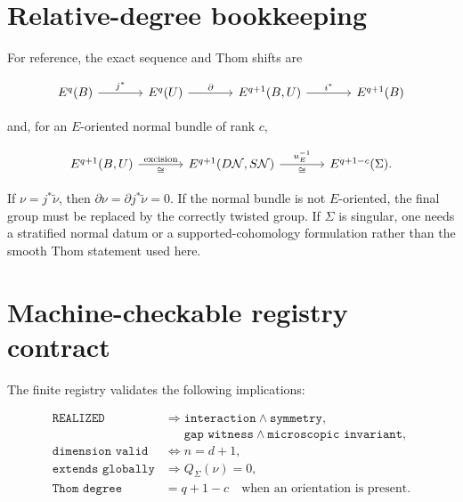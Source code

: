 \documentclass[12pt]{article}
\theoremstyle{definition}
\theoremstyle{remark}
\begin{document}
\section{Relative-degree bookkeeping}

For reference, the exact sequence and Thom shifts are

\begin{equation}
\begin{tikzcd}[column sep=large]
E^q(B) \arrow[r,"j^*"]
& E^q(U) \arrow[r,"\partial"]
& E^{q+1}(B,U) \arrow[r,"i^*"]
& E^{q+1}(B)
\end{tikzcd}
\end{equation}

and, for an $E$-oriented normal bundle of rank $c$,

\begin{equation}
\begin{tikzcd}[column sep=large]
E^{q+1}(B,U)
  \arrow[r,"\text{excision}","\cong"']
& E^{q+1}(D\mathcal N,S\mathcal N)
  \arrow[r,"u_E^{-1}","\cong"']
& E^{q+1-c}(\Sigma).
\end{tikzcd}
\end{equation}

If $\nu=j^*\widetilde\nu$, then
$\partial\nu=\partial j^*\widetilde\nu=0$.  If the normal bundle is not
$E$-oriented, the final group must be replaced by the correctly twisted
group.  If $\Sigma$ is singular, one needs a stratified normal datum or a
supported-cohomology formulation rather than the smooth Thom statement used
here.

\section{Machine-checkable registry contract}

The finite registry validates the following implications:

\begin{align}
\texttt{REALIZED}
&\Longrightarrow
\texttt{interaction}\wedge\texttt{symmetry}, \\
&\phantom{\Longrightarrow{}}
\texttt{gap witness}\wedge\texttt{microscopic invariant}, \\
\texttt{dimension valid}
&\Longleftrightarrow n=d+1, \\
\texttt{extends globally}
&\Longrightarrow Q_\Sigma(\nu)=0, \\
\texttt{Thom degree}
&=q+1-c
\quad\text{when an orientation is present.}
\end{align}
\end{document}
